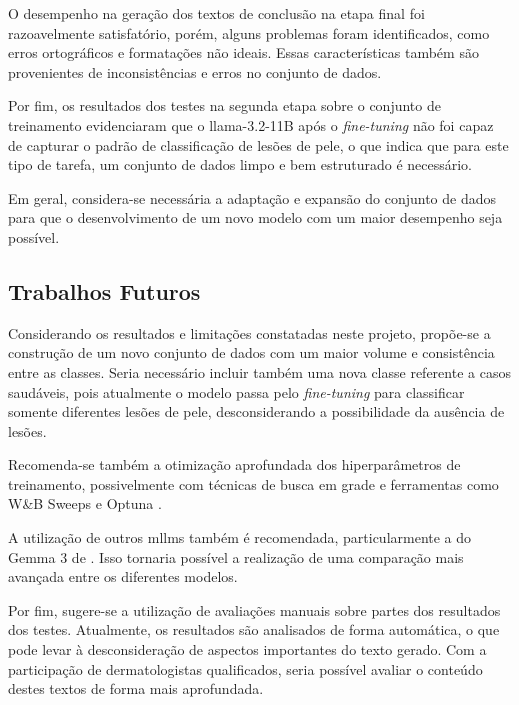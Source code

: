 O desempenho na geração dos textos de conclusão na etapa final foi razoavelmente satisfatório, porém, alguns problemas
foram identificados, como erros ortográficos e formatações não ideais. Essas características também são provenientes de
inconsistências e erros no conjunto de dados.

Por fim, os resultados dos testes na segunda etapa sobre o conjunto de treinamento evidenciaram que o
\ac{llama}-3.2-11B após o \textit{fine-tuning} não foi capaz de capturar o padrão de classificação de lesões de pele,
o que indica que para este tipo de tarefa, um conjunto de dados limpo e bem estruturado é necessário.

Em geral, considera-se necessária a adaptação e expansão do conjunto de dados para que o desenvolvimento de um novo
modelo com um maior desempenho seja possível.

\subsection{Trabalhos Futuros}

Considerando os resultados e limitações constatadas neste projeto, propõe-se a construção de um novo conjunto de dados
com um maior volume e consistência entre as classes. Seria necessário incluir também uma nova classe referente a casos
saudáveis, pois atualmente o modelo passa pelo \textit{fine-tuning} para classificar somente diferentes lesões de pele,
desconsiderando a possibilidade da ausência de lesões.

Recomenda-se também a otimização aprofundada dos hiperparâmetros de treinamento, possivelmente com técnicas de busca em
grade e ferramentas como W\&B Sweeps e Optuna \cite{wab_sweeps, optuna_2019}.

A utilização de outros \acp{mllm} também é recomendada, particularmente a do Gemma 3 de \textcite{team2025gemma}. Isso
tornaria possível a realização de uma comparação mais avançada entre os diferentes modelos.

Por fim, sugere-se a utilização de avaliações manuais sobre partes dos resultados dos testes. Atualmente, os resultados
são analisados de forma automática, o que pode levar à desconsideração de aspectos importantes do texto gerado. Com a
participação de dermatologistas qualificados, seria possível avaliar o conteúdo destes textos de forma mais
aprofundada.
